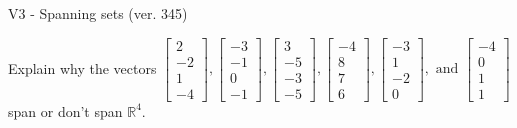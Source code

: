 \begin{exercise}
  \begin{exerciseTitle}V3 - Spanning sets (ver. 345)\end{exerciseTitle}
  \begin{exerciseStatement}
    Explain why the vectors \(\left[\begin{array}{r}
2 \\
-2 \\
1 \\
-4
\end{array}\right] , \left[\begin{array}{r}
-3 \\
-1 \\
0 \\
-1
\end{array}\right] , \left[\begin{array}{r}
3 \\
-5 \\
-3 \\
-5
\end{array}\right] , \left[\begin{array}{r}
-4 \\
8 \\
7 \\
6
\end{array}\right] , \left[\begin{array}{r}
-3 \\
1 \\
-2 \\
0
\end{array}\right] , \text{ and } \left[\begin{array}{r}
-4 \\
0 \\
1 \\
1
\end{array}\right]\) span or don't span \(\mathbb{R}^4\). 
	



\end{exerciseStatement}
\end{exercise}
